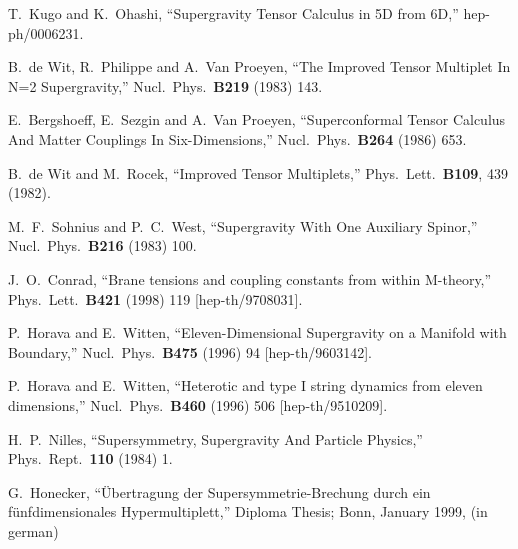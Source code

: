 \documentclass[a4paper,12pt, twoside]{article}
\numberwithin{equation}{section}
\begin{document}
\begin{thebibliography}{99}
T.~Kugo and K.~Ohashi,
``Supergravity Tensor Calculus in 5D from 6D,''
hep-ph/0006231.


B.~de Wit, R.~Philippe and A.~Van Proeyen,
``The Improved Tensor Multiplet In N=2 Supergravity,''
Nucl.\ Phys.\  {\bf B219} (1983) 143.


E.~Bergshoeff, E.~Sezgin and A.~Van Proeyen,
``Superconformal Tensor Calculus And Matter Couplings In 
Six-Dimensions,''
Nucl.\ Phys.\  {\bf B264} (1986) 653.


B.~de Wit and M.~Rocek,
``Improved Tensor Multiplets,''
Phys.\ Lett.\  {\bf B109}, 439 (1982).


M.~F.~Sohnius and P.~C.~West,
``Supergravity With One Auxiliary Spinor,''
Nucl.\ Phys.\  {\bf B216} (1983) 100.


J.~O.~Conrad,
``Brane tensions and coupling constants from within M-theory,''
Phys.\ Lett.\  {\bf B421} (1998) 119
[hep-th/9708031].


P.~Horava and E.~Witten,
``Eleven-Dimensional Supergravity on a Manifold with Boundary,''
Nucl.\ Phys.\  {\bf B475} (1996) 94
[hep-th/9603142].


P.~Horava and E.~Witten,
``Heterotic and type I string dynamics from eleven dimensions,''
Nucl.\ Phys.\  {\bf B460} (1996) 506
[hep-th/9510209].


H.~P.~Nilles,
``Supersymmetry, Supergravity And Particle Physics,''
Phys.\ Rept.\  {\bf 110} (1984) 1.


G.~Honecker,
``\"Ubertragung der Supersymmetrie-Brechung durch ein 
f\"unf\-dimensionales Hypermultiplett,''
Diploma Thesis;
Bonn, January 1999,
(in german)




\end{thebibliography}
\end{document}

